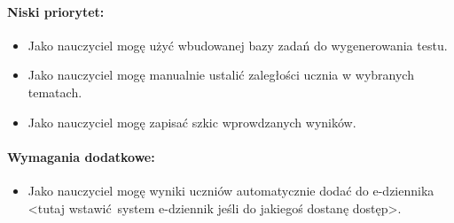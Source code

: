 \documentclass[polish,12pt]{aghthesis}
\begin{document}
\paragraph{Niski priorytet:}
\begin{itemize}
	\item Jako nauczyciel mogę użyć wbudowanej bazy zadań do wygenerowania testu.
	\item Jako nauczyciel mogę manualnie ustalić zaległości ucznia w wybranych tematach.
	\item Jako nauczyciel mogę zapisać szkic wprowdzanych wyników.
\end{itemize}

\paragraph{Wymagania dodatkowe:}
\begin{itemize}
	\item Jako nauczyciel mogę wyniki uczniów automatycznie dodać do e-dziennika <tutaj wstawić system e-dziennik jeśli do jakiegoś dostanę dostęp>.
\end{itemize}


\section{\SectionTitleRealizationAspects}
\label{sec:wybrane-aspekty-realizacji}

\section{\SectionTitleWorkOrganization}
\label{sec:organizacja-pracy}

\section{\SectionTitleResults}
\label{sec:wyniki-projektu}




\end{document}
